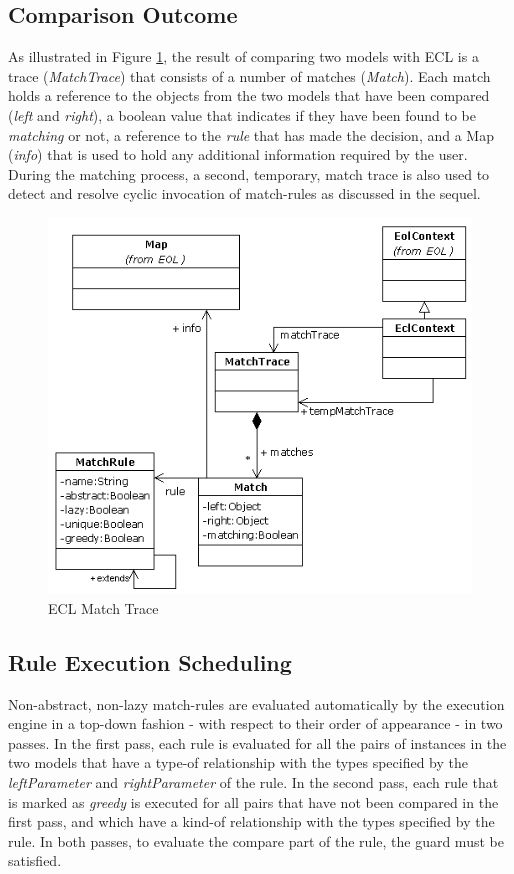\subsection{Comparison Outcome}

As illustrated in Figure \ref{fig:ECLRuntime}, the result of comparing two models with ECL is a trace (\emph{MatchTrace}) that consists of a number of matches (\emph{Match}). Each match holds a reference to the objects from the two models that have been compared (\emph{left} and \emph{right}), a boolean value that indicates if they have been found to be \emph{matching} or not, a reference to the \emph{rule} that has made the decision, and a Map (\emph{info}) that is used to hold any additional information required by the user. During the matching process, a second, temporary, match trace is also used to detect and resolve cyclic invocation of match-rules as discussed in the sequel.

\begin{figure}
	\centering
		\includegraphics{images/ECLRuntime.png}
	\caption{ECL Match Trace}
	\label{fig:ECLRuntime}
\end{figure}

\subsection{Rule Execution Scheduling}

Non-abstract, non-lazy match-rules are evaluated automatically by the execution engine in a top-down fashion - with respect to their order of appearance - in two passes. In the first pass, each rule is evaluated for all the pairs of instances in the two models that have a type-of relationship with the types specified by the \emph{leftParameter} and \emph{rightParameter} of the rule. In the second pass, each rule that is marked as \emph{greedy} is executed for all pairs that have not been compared in the first pass, and which have a kind-of relationship with the types specified by the rule. In both passes, to evaluate the compare part of the rule, the guard must be satisfied.

